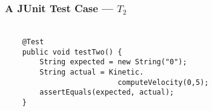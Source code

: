 
\begin{frame}[fragile]
  \frametitle{\vspace*{.5in}A JUnit Test Case --- $T_2$}
  \framesubtitle{}

  \normalsize
  \hspace*{-.65in}
  \begin{minipage}{5in}
    \Large
    \vspace*{-.1in}
    \begin{verbatim}

    @Test
    public void testTwo() {
        String expected = new String("0");
        String actual = Kinetic.
                          computeVelocity(0,5);
        assertEquals(expected, actual);
    }

    \end{verbatim}
  \vspace*{.05in}
  \end{minipage}
  \normalsize
  \HUGE



\end{frame}
